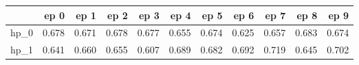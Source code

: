 \begin{tabular}{lrrrrrrrrrr}
\toprule
{} &   ep 0 &   ep 1 &   ep 2 &   ep 3 &   ep 4 &   ep 5 &   ep 6 &   ep 7 &   ep 8 &   ep 9 \\
\midrule
hp\_0 &  0.678 &  0.671 &  0.678 &  0.677 &  0.655 &  0.674 &  0.625 &  0.657 &  0.683 &  0.674 \\
hp\_1 &  0.641 &  0.660 &  0.655 &  0.607 &  0.689 &  0.682 &  0.692 &  0.719 &  0.645 &  0.702 \\
\bottomrule
\end{tabular}
